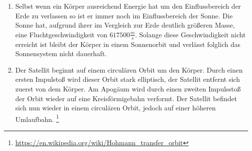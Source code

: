 \documentclass[DIN, pagenumber=false, fontsize=11pt, parskip=half]{scrartcl}
\begin{document}
\begin{enumerate}[label=\alph*)]
            
        \item Selbst wenn ein Körper ausreichend Energie hat um den Einflussbereich
            der Erde zu verlassen so ist er immer noch im Einflussbereich der Sonne.
            Die Sonne hat, aufgrund ihrer im Vergleich zur Erde deutlich größeren Masse,
            eine Fluchtgeschwindigkeit von $617500\frac{m}{s}$. Solange diese 
            Geschwindigkeit nicht erreicht ist bleibt der Körper in einem Sonnenorbit
            und verlässt folglich das Sonnensystem nicht dauerhaft.
        \item Der Satellit beginnt auf einem circulären Orbit um den Körper. Durch
            einen ersten Impulstoß wird dieser Orbit stark elliptisch, der Satellit 
            entfernt sich zuerst von dem Körper. Am Apogäum wird durch einen zweiten 
            Impulsstoß der Orbit wieder auf eine Kreisförmigebahn verformt. Der Satellit
            befindet sich nun wieder in einem circulären Orbit, jedoch auf einer höheren
            Umlaufbahn.
            \footnote{\url{https://en.wikipedia.org/wiki/Hohmann_transfer_orbit}}
    \end{enumerate}
\end{document}
